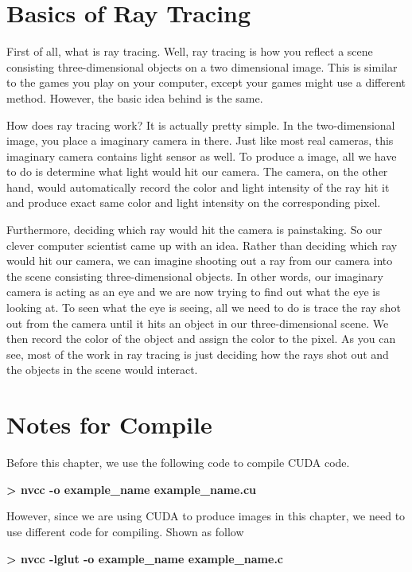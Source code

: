 \documentclass[letterpaper,10pt,english]{sphinxmanual}
\begin{document}
\section{Basics of Ray Tracing}
\label{RTACM/RTACM:basics-of-ray-tracing}
First of all, what is ray tracing. Well, ray tracing is how you reflect a scene consisting three-dimensional objects on a two dimensional image. This is similar to the games you play on your computer, except your games might use a different method. However, the basic idea behind is the same.

How does ray tracing work? It is actually pretty simple. In the two-dimensional image, you place a imaginary camera in there. Just like most real cameras, this imaginary camera contains light sensor as well. To produce a image, all we have to do is determine what light would hit our camera. The camera, on the other hand, would automatically record the color and light intensity of the ray hit it and produce exact same color and light intensity on the corresponding pixel.

Furthermore, deciding which ray would hit the camera is painstaking. So our clever computer scientist came up with an idea. Rather than deciding which ray would hit our camera, we can imagine shooting out a ray from our camera into the scene consisting three-dimensional objects. In other words, our imaginary camera is acting as an eye and we are now trying to find out what the eye is looking at. To seen what the eye is seeing, all we need to do is trace the ray shot out from the camera until it hits an object in our three-dimensional scene. We then record the color of the object and assign the color to the pixel. As you can see, most of the work in ray tracing is just deciding how the rays shot out and the objects in the scene would interact.


\section{Notes for Compile}
\label{RTACM/RTACM:notes-for-compile}
Before this chapter, we use the following code to compile CUDA code.

\textbf{\textgreater{} nvcc -o example\_name example\_name.cu}

However, since we are using CUDA to produce images in this chapter, we need to use different code for compiling. Shown as follow

\textbf{\textgreater{} nvcc -lglut -o example\_name example\_name.c}
\end{document}
